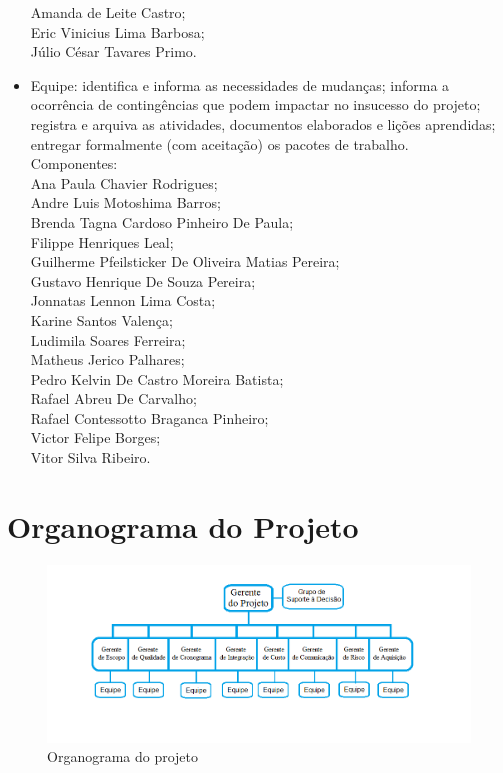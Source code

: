 \begin{itemize}
  Amanda de Leite Castro;\\
  Eric Vinicius Lima Barbosa;\\
  Júlio César Tavares Primo.\\
  \item Equipe: identifica e informa as necessidades de mudanças; informa a ocorrência de contingências que podem impactar no insucesso do projeto; registra e arquiva as atividades, documentos elaborados e lições aprendidas; entregar formalmente (com aceitação) os pacotes de trabalho.\\
Componentes:\\
Ana Paula Chavier Rodrigues;\\
Andre Luis Motoshima Barros;\\
Brenda Tagna Cardoso Pinheiro De Paula;\\
Filippe Henriques Leal;\\
Guilherme Pfeilsticker De Oliveira Matias Pereira;\\
Gustavo Henrique De Souza Pereira;\\
Jonnatas Lennon Lima Costa;\\
Karine Santos Valença;\\
Ludimila Soares Ferreira;\\
Matheus Jerico Palhares;\\
Pedro Kelvin De Castro Moreira Batista;\\
Rafael Abreu De Carvalho;\\
Rafael Contessotto Braganca Pinheiro;\\
Victor Felipe Borges;\\
Vitor Silva Ribeiro.\\
  \end{itemize}
\newpage
\section*{Organograma do Projeto}
  \begin{figure}[!ht]
\centering
\includegraphics[scale=0.6]{editaveis/figuras/Organograma}
\caption{Organograma do projeto}
\label{Organograma}
\end{figure}
\FloatBarrier

